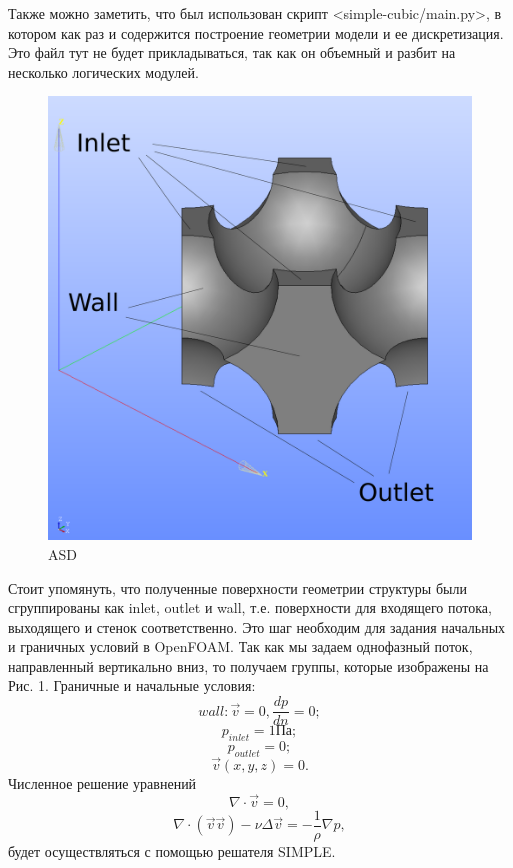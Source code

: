 \documentclass[a4paper, 12pt]{article}
\begin{document}
    Также можно заметить, что был использован скрипт <simple-cubic/main.py>, в котором как раз и содержится построение геометрии модели и ее дискретизация. Это файл тут не будет прикладываться, так как он объемный и разбит на несколько логических модулей.
    
    \begin{figure}[t!]
        \centering
        
        \includegraphics[scale=0.2]{simple-cubic}
        \caption{ASD}
    \end{figure}

    Стоит упомянуть, что полученные поверхности геометрии структуры были сгруппированы как inlet, outlet и wall, т.е. поверхности для входящего потока, выходящего и стенок соответственно. Это шаг необходим для задания начальных и граничных условий в OpenFOAM. Так как мы задаем однофазный поток, направленный вертикально вниз, то получаем группы, которые изображены на Рис. 1. Граничные и начальные условия:
    \[
        wall: \vec{v} = 0, \frac{d p}{d n} = 0;
    \]
    \[
        p_{inlet} = 1 \text{Па};
    \]
    \[
        p_{outlet} = 0;
    \]
    \[
        \vec{v}(x, y, z) = 0.
    \]
    Численное решение уравнений
    \[
        \nabla \cdot \vec{v} = 0,
    \]
    \[
        \nabla \cdot (\vec{v} \vec{v}) - \nu \Delta \vec{v} = -\frac{1}{\rho} \nabla p,
    \]
    будет осуществляться с помощью решателя SIMPLE.
    \newpage
\end{document}
